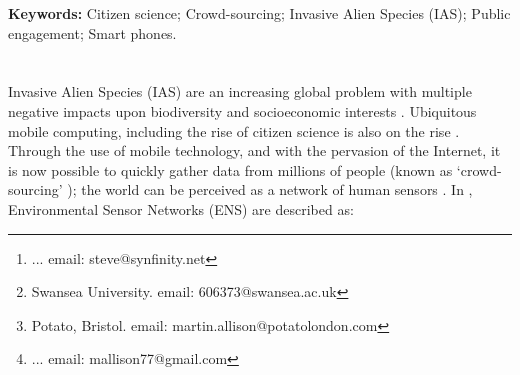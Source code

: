 \documentclass[10pt,psfig,letterpaper,twocolumn]{article}
\begin{document}
% 
%


\title{}
\author{
{}\thanks{... email: steve@synfinity.net }, \and
{}\thanks{Swansea University. email: 606373@swansea.ac.uk}, \and 
{}\thanks{Potato, Bristol. email: martin.allison@potatolondon.com}, \and
{}\thanks{... email: mallison77@gmail.com}\\
}
\date{}
\maketitle
\thispagestyle{empty}
\begin{abstract}
Invasive Alien Species (IAS) are a growing global problem, reducing biodiversity and causing significant negative socioeconomic impacts. Management and control is hampered by a lack of accessible data of adequate spatial and temporal resolution. Smart phone technology and cheap access to data networks may enable crowd-sourcing of IAS data to bridge the `data gap'. By engaging the general public in `citizen science', IAS-ESS (iAssess) aims to provide much-needed, real-time data to scientists.
\end{abstract}
{\bf Keywords:}
Citizen science; Crowd-sourcing; Invasive Alien Species (IAS);  Public engagement; Smart phones.
\section*{}

Invasive Alien Species (IAS) are an increasing global problem with multiple negative impacts upon biodiversity and socioeconomic interests \cite{Vila:2011ft}. Ubiquitous mobile computing, including the rise of  citizen science is also on the rise \cite{Silvertown:2009tw}. Through the use of mobile technology, and with the pervasion of the Internet, it is now possible to quickly gather data from millions of people (known as `crowd-sourcing' \cite{Wired:2011uj}); the world can be perceived as a network of human sensors \cite{Goodchild:2007vt}. In \citet{Hart:2006uz}, Environmental Sensor Networks (ENS) are described as:
\end{document}
